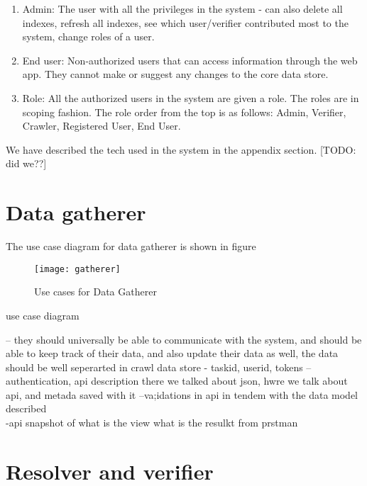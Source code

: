 \begin{enumerate}
    \item Admin: The user with all the privileges in the system - can also delete all indexes, refresh all indexes, see which user/verifier contributed most to the system, change roles of a user.

    \item End user: Non-authorized users that can access information through the web app. They cannot make or suggest any changes to the core data store.

    \item Role: All the authorized users in the system are given a role. The roles are in scoping fashion. The role order from the top is as follows: Admin, Verifier, Crawler, Registered User, End User.  

\end{enumerate}

We have described the tech used in the system in the appendix section. [TODO: did we??]



\section{Data gatherer}

The use case diagram for data gatherer is shown in figure 

\begin{figure}[H]
\begin{center}  
\texttt{[image: gatherer]} 
\caption{Use cases for Data Gatherer}
\label{fig:gatherer}
\end{center}
\end{figure}

use case diagram


  -- they should universally be able to communicate with the system, and should be able to keep track of their data, and also update their data as well, the data should be well seperarted in crawl data store - taskid, userid, tokens -- authentication, api description
  there we talked about json, hwre we talk about api, and metada saved with it
  --va;idations in api in tendem with the data model described  \\
-api snapshot
of what is the view
what is the resulkt from prstman

\section{Resolver and verifier}

